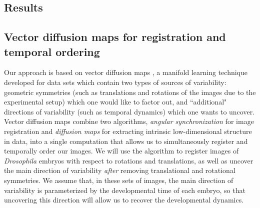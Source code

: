 \documentclass{pnastwo}
\begin{document}
\begin{article}
\section{Results}

\subsection{Vector diffusion maps for registration and temporal ordering}

%
%
%
Our approach is based on vector diffusion maps \cite{singer2012vector}, a manifold learning
technique developed for data sets which contain two types of sources of variability:
geometric symmetries (such as translations and rotations of the images due to the experimental setup) which one would like to factor out,
and ``additional" directions of variability (such as temporal dynamics) which one wants to uncover.
%
Vector diffusion maps combine two algorithms, {\em angular synchronization} \cite{singer2011angular} for image registration and {\em diffusion maps} \cite{coifman2005geometric} for extracting intrinsic low-dimensional structure in data, into a single computation that allows us to simultaneously register and temporally order our images.
%
%
We will use the algorithm to register images of {\it Drosophila} embryos with respect to rotations and translations, as well as uncover the main direction of variability {\it after} removing translational and rotational symmetries.
%
We assume that, in these sets of images, the main direction of variability is parameterized by the developmental time of each embryo, so that uncovering this direction will allow us to recover the developmental dynamics.


\end{article}
\end{document}

